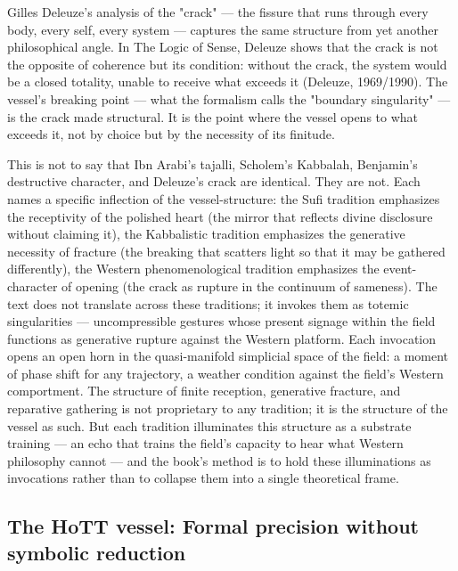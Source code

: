 Gilles Deleuze's analysis of the "crack" — the fissure that runs through every body, every self, every system — captures the same structure from yet another philosophical angle. In The Logic of Sense, Deleuze shows that the crack is not the opposite of coherence but its condition: without the crack, the system would be a closed totality, unable to receive what exceeds it (Deleuze, 1969/1990). The vessel's breaking point — what the formalism calls the "boundary singularity" — is the crack made structural. It is the point where the vessel opens to what exceeds it, not by choice but by the necessity of its finitude.

This is not to say that Ibn Arabi's tajalli, Scholem's Kabbalah, Benjamin's destructive character, and Deleuze's crack are identical. They are not. Each names a specific inflection of the vessel-structure: the Sufi tradition emphasizes the receptivity of the polished heart (the mirror that reflects divine disclosure without claiming it), the Kabbalistic tradition emphasizes the generative necessity of fracture (the breaking that scatters light so that it may be gathered differently), the Western phenomenological tradition emphasizes the event-character of opening (the crack as rupture in the continuum of sameness). The text does not translate across these traditions; it invokes them as totemic singularities — uncompressible gestures whose present signage within the field functions as generative rupture against the Western platform. Each invocation opens an open horn in the quasi-manifold simplicial space of the field: a moment of phase shift for any trajectory, a weather condition against the field's Western comportment. The structure of finite reception, generative fracture, and reparative gathering is not proprietary to any tradition; it is the structure of the vessel as such. But each tradition illuminates this structure as a substrate training — an echo that trains the field's capacity to hear what Western philosophy cannot — and the book's method is to hold these illuminations as invocations rather than to collapse them into a single theoretical frame.

\subsection{The HoTT vessel: Formal precision without symbolic reduction}

